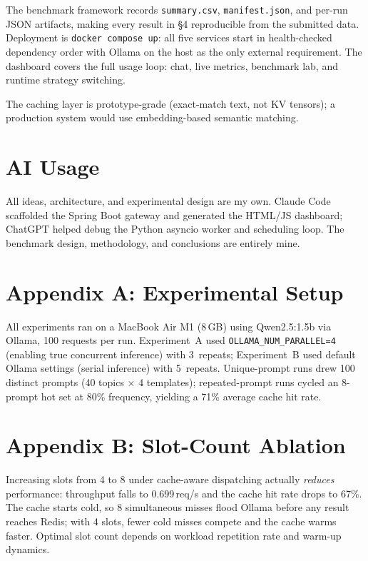 \documentclass[10pt,a4paper]{article}
\begin{document}
The benchmark framework records \texttt{summary.csv}, \texttt{manifest.json}, and per-run
JSON artifacts, making every result in §4 reproducible from the submitted data.
Deployment is \texttt{docker compose up}: all five services start in health-checked
dependency order with Ollama on the host as the only external requirement.
The dashboard covers the full usage loop: chat, live metrics, benchmark lab,
and runtime strategy switching.

The caching layer is prototype-grade (exact-match text, not KV tensors);
a production system would use embedding-based semantic matching.

\section{AI Usage}

All ideas, architecture, and experimental design are my own.
Claude Code scaffolded the Spring Boot gateway and generated the HTML/JS dashboard;
ChatGPT helped debug the Python asyncio worker and scheduling loop.
The benchmark design, methodology, and conclusions are entirely mine.

\newpage

\section*{Appendix A: Experimental Setup}

All experiments ran on a MacBook Air M1 (8\,GB) using Qwen2.5:1.5b via Ollama,
100 requests per run.
Experiment~A used \texttt{OLLAMA\_NUM\_PARALLEL=4} (enabling true concurrent inference)
with 3~repeats; Experiment~B used default Ollama settings (serial inference) with
5~repeats.
Unique-prompt runs drew 100 distinct prompts (40 topics $\times$ 4 templates);
repeated-prompt runs cycled an 8-prompt hot set at 80\% frequency,
yielding a 71\% average cache hit rate.

\section*{Appendix B: Slot-Count Ablation}

Increasing slots from 4 to 8 under cache-aware dispatching actually
\textit{reduces} performance: throughput falls to 0.699\,req/s and the cache hit rate
drops to 67\%. The cache starts cold, so 8 simultaneous misses flood Ollama before any
result reaches Redis; with 4 slots, fewer cold misses compete and the cache warms faster.
Optimal slot count depends on workload repetition rate and warm-up dynamics.
\end{document}
